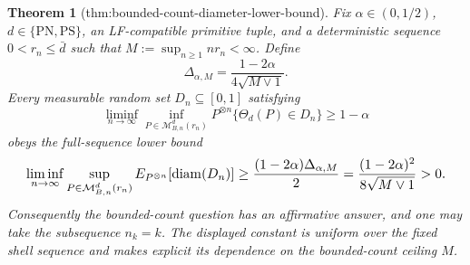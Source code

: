 \documentclass{article}
\newtheorem{theorem}{Theorem}
\begin{document}
\begin{theorem}[thm:bounded-count-diameter-lower-bound]\label{thm:bounded-count-diameter-lower-bound}
Fix \(\alpha\in(0,1/2)\), \(d\in\{\mathrm{PN},\mathrm{PS}\}\), an LF-compatible primitive tuple, and a deterministic sequence \(0<r_n\le\bar d\) such that \(M:=\sup_{n\ge1}nr_n<\infty\). Define
\[\Delta_{\alpha,M}=\frac{1-2\alpha}{4\sqrt{M\vee1}}.\]
Every measurable random set \(D_n\subseteq[0,1]\) satisfying
\[\liminf_{n\to\infty}\inf_{P\in\mathcal M_{B,n}^d(r_n)}P^{\otimes n}\{\Theta_d(P)\in D_n\}\ge1-\alpha\]
obeys the full-sequence lower bound
\[
\makebox[\linewidth][c]{\resizebox{0.98\linewidth}{!}{\par\noindent \makebox[\linewidth][c]{\resizebox{0.98\linewidth}{!}{\(\displaystyle \displaystyle \liminf_{n\to\infty}\sup_{P\in\mathcal M_{B,n}^d(r_n)}E_{P^{\otimes n}}[\operatorname{diam}(D_n)]\ge\frac{(1-2\alpha)\Delta_{\alpha,M}}2=\frac{(1-2\alpha)^2}{8\sqrt{M\vee1}}>0.\)}}\par\noindent}}
\]
Consequently the bounded-count question has an affirmative answer, and one may take the subsequence \(n_k=k\). The displayed constant is uniform over the fixed shell sequence and makes explicit its dependence on the bounded-count ceiling \(M\).
\end{theorem}
\end{document}
